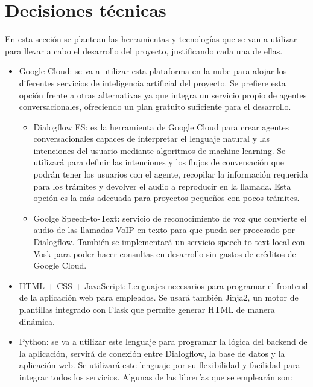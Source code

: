 \documentclass[12pt, a4paper, twoside]{report}
\begin{document}
    \section{Decisiones técnicas}
        En esta sección se plantean las herramientas y tecnologías que se van a utilizar para llevar a cabo el desarrollo del proyecto, justificando cada una de ellas.
        \begin{itemize}
            \item Google Cloud: se va a utilizar esta plataforma en la nube para alojar los diferentes servicios de inteligencia artificial del proyecto.
                Se prefiere esta opción frente a otras alternativas ya que integra un servicio propio de agentes conversacionales, ofreciendo un plan gratuito suficiente para el desarrollo.
                \begin{itemize}
                    \item Dialogflow ES: es la herramienta de Google Cloud para crear agentes conversacionales capaces de interpretar el lenguaje natural y las intenciones del usuario mediante algoritmos de machine learning. 
                        Se utilizará para definir las intenciones y los flujos de conversación que podrán tener los usuarios con el agente, recopilar la información requerida para los trámites y devolver el audio a reproducir en la llamada.
                        Esta opción es la más adecuada para proyectos pequeños con pocos trámites.
                    \item Goolge Speech-to-Text: servicio de reconocimiento de voz que convierte el audio de las llamadas VoIP en texto para que pueda ser procesado por Dialogflow. 
                        También se implementará un servicio speech-to-text local con Vosk para poder hacer consultas en desarrollo sin gastos de créditos de Google Cloud.
                \end{itemize}
            \item HTML + CSS + JavaScript: Lenguajes necesarios para programar el frontend de la aplicación web para empleados. 
                Se usará también Jinja2, un motor de plantillas integrado con Flask que permite generar HTML de manera dinámica.
            \item Python: se va a utilizar este lenguaje para programar la lógica del backend de la aplicación, servirá de conexión entre Dialogflow, la base de datos y la aplicación web. 
                Se utilizará este lenguaje por su flexibilidad y facilidad para integrar todos los servicios. Algunas de las librerías que se emplearán son:

\end{itemize}
\end{document}
